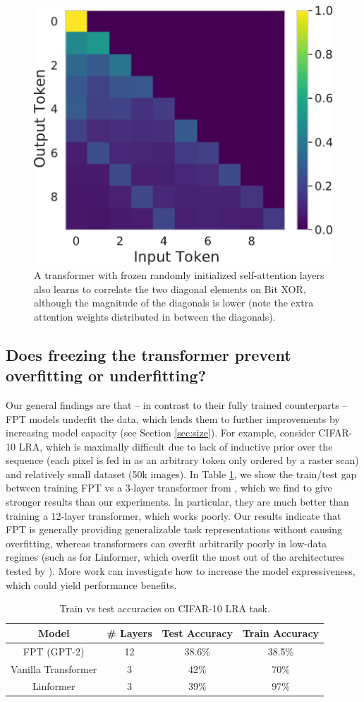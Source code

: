 \begin{figure}[H]
    \centering
    \includegraphics[width=0.3\linewidth]{figures/attention_maps/xor_random}
    \caption{
        A transformer with frozen randomly initialized self-attention layers also learns to correlate the two diagonal elements on Bit XOR, although the magnitude of the diagonals is lower (note the extra attention weights distributed in between the diagonals).
    }
    \label{fig:attn_xor_random}
\end{figure}

\subsection{Does freezing the transformer prevent overfitting or underfitting?}
\label{sec:generalization}

Our general findings are that -- in contrast to their fully trained counterparts -- FPT models underfit the data, which lends them to further improvements by increasing model capacity (see Section \ref{sec:size}).
For example, consider CIFAR-10 LRA, which is maximally difficult due to lack of inductive prior over the sequence (each pixel is fed in as an arbitrary token only ordered by a raster scan) and relatively small dataset (50k images).
In Table \ref{table:generalization}, we show the train/test gap between training FPT vs a 3-layer transformer from \cite{tay2020lra}, which we find to give stronger results than our experiments.
In particular, they are much better than training a 12-layer transformer, which works poorly.
Our results indicate that FPT is generally providing generalizable task representations without causing overfitting, whereas transformers can overfit arbitrarily poorly in low-data regimes (such as for Linformer, which overfit the most out of the architectures tested by \cite{tay2020lra}).
More work can investigate how to increase the model expressiveness, which could yield performance benefits.

\begin{table}[h] 
\begin{center}
\begin{tabular}{c|c|cc}
\toprule
\textbf{Model} & \textbf{\# Layers} & \multicolumn{1}{c}{\bf Test Accuracy} & \multicolumn{1}{c}{\bf Train Accuracy} \\
\midrule
FPT (GPT-2) & 12 & 38.6\% & 38.5\% \\
Vanilla Transformer & 3 & 42\% & 70\% \\
Linformer & 3 & 39\% & 97\% \\
\bottomrule
\end{tabular}
\end{center}
\caption{Train vs test accuracies on CIFAR-10 LRA task.}\label{table:generalization}
\end{table}


